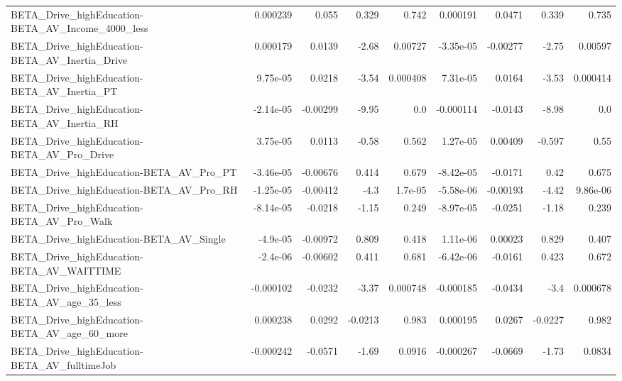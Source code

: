 \begin{tabular}{lrrrrrrrr}
BETA\_Drive\_highEducation-BETA\_AV\_Income\_4000\_less  &    0.000239 &        0.055 &    0.329 &    0.742 &   0.000191 &      0.0471 &        0.339 &         0.735 \\
BETA\_Drive\_highEducation-BETA\_AV\_Inertia\_Drive     &    0.000179 &       0.0139 &    -2.68 &  0.00727 &  -3.35e-05 &    -0.00277 &        -2.75 &       0.00597 \\
BETA\_Drive\_highEducation-BETA\_AV\_Inertia\_PT        &    9.75e-05 &       0.0218 &    -3.54 & 0.000408 &   7.31e-05 &      0.0164 &        -3.53 &      0.000414 \\
BETA\_Drive\_highEducation-BETA\_AV\_Inertia\_RH        &   -2.14e-05 &     -0.00299 &    -9.95 &      0.0 &  -0.000114 &     -0.0143 &        -8.98 &           0.0 \\
BETA\_Drive\_highEducation-BETA\_AV\_Pro\_Drive         &    3.75e-05 &       0.0113 &    -0.58 &    0.562 &   1.27e-05 &     0.00409 &       -0.597 &          0.55 \\
BETA\_Drive\_highEducation-BETA\_AV\_Pro\_PT            &   -3.46e-05 &     -0.00676 &    0.414 &    0.679 &  -8.42e-05 &     -0.0171 &         0.42 &         0.675 \\
BETA\_Drive\_highEducation-BETA\_AV\_Pro\_RH            &   -1.25e-05 &     -0.00412 &     -4.3 &  1.7e-05 &  -5.58e-06 &    -0.00193 &        -4.42 &      9.86e-06 \\
BETA\_Drive\_highEducation-BETA\_AV\_Pro\_Walk          &   -8.14e-05 &      -0.0218 &    -1.15 &    0.249 &  -8.97e-05 &     -0.0251 &        -1.18 &         0.239 \\
BETA\_Drive\_highEducation-BETA\_AV\_Single            &    -4.9e-05 &     -0.00972 &    0.809 &    0.418 &   1.11e-06 &     0.00023 &        0.829 &         0.407 \\
BETA\_Drive\_highEducation-BETA\_AV\_WAITTIME          &    -2.4e-06 &     -0.00602 &    0.411 &    0.681 &  -6.42e-06 &     -0.0161 &        0.423 &         0.672 \\
BETA\_Drive\_highEducation-BETA\_AV\_age\_35\_less       &   -0.000102 &      -0.0232 &    -3.37 & 0.000748 &  -0.000185 &     -0.0434 &         -3.4 &      0.000678 \\
BETA\_Drive\_highEducation-BETA\_AV\_age\_60\_more       &    0.000238 &       0.0292 &  -0.0213 &    0.983 &   0.000195 &      0.0267 &      -0.0227 &         0.982 \\
BETA\_Drive\_highEducation-BETA\_AV\_fulltimeJob       &   -0.000242 &      -0.0571 &    -1.69 &   0.0916 &  -0.000267 &     -0.0669 &        -1.73 &        0.0834 \\

\end{tabular}
